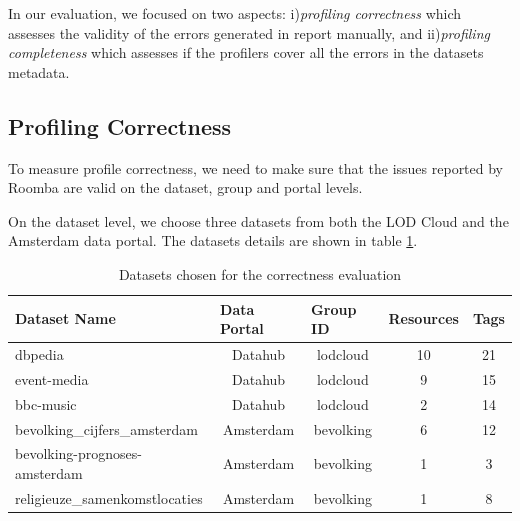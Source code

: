 \documentclass[runningheads,a4paper]{llncs}
\begin{document}
In our evaluation, we focused on two aspects: i)\textit{profiling correctness} which assesses the validity of the errors generated in report manually, and ii)\textit{profiling completeness} which assesses if the profilers cover all the errors in the datasets metadata.

\subsection{Profiling Correctness}

To measure profile correctness, we need to make sure that the issues reported by Roomba are valid on the dataset, group and portal levels.

On the dataset level, we choose three datasets from both the LOD Cloud and the Amsterdam data portal. The datasets details are shown in table \ref{tab:datasesExperiment}.

\begin{table}[ht]
\centering
\footnotesize\setlength{\tabcolsep}{1.5pt}
\begin{tabular}{|l|c|c|c|c|}
\hline
\textbf{Dataset Name}          & \multicolumn{1}{l|}{\textbf{Data Portal}} & \multicolumn{1}{l|}{\textbf{Group ID}} & \multicolumn{1}{l|}{\textbf{Resources}} & \multicolumn{1}{l|}{\textbf{Tags}} \\ \hline
dbpedia                        & Datahub                                   & lodcloud                               & 10                                      & 21                                 \\ \hline
event-media                    & Datahub                                   & lodcloud                               & 9                                       & 15                                 \\ \hline
bbc-music                      & Datahub                                   & lodcloud                               & 2                                       & 14                                 \\ \hline
bevolking\_cijfers\_amsterdam  & Amsterdam                                 & bevolking                              & 6                                       & 12                                 \\ \hline
bevolking-prognoses-amsterdam  & Amsterdam                                 & bevolking                              & 1                                       & 3                                  \\ \hline
religieuze\_samenkomstlocaties & Amsterdam                                 & bevolking                              & 1                                       & 8                                  \\ \hline
\end{tabular}
\caption{Datasets chosen for the correctness evaluation}
\label{tab:datasesExperiment}
\end{table}
\end{document}
